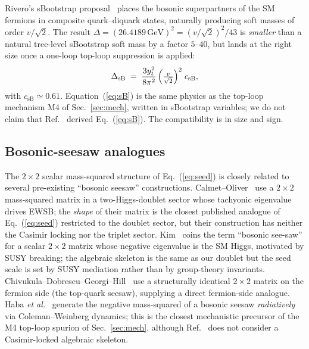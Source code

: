 \documentclass[%
 aps,
 prd,
 reprint,
 nofootinbib,
 superscriptaddress,
 amsmath,
 amssymb,
]{revtex4-2}
\begin{document}
Rivero's sBootstrap proposal~\cite{Rivero2005sBoot} places the bosonic superpartners of the SM fermions in composite quark--diquark states, naturally producing soft masses of order $v/\sqrt{2}$. The result $\Delta=(26.4189\,\mathrm{GeV})^2=(v/\sqrt{2})^2/43$ is \emph{smaller} than a natural tree-level sBootstrap soft mass by a factor $5$--$40$, but lands at the right size once a one-loop top-loop suppression is applied:
\begin{equation}\label{eq:sB}
\Delta_{\mathrm{sB}}\;=\;\frac{3y_t^2}{8\pi^2}\,\Bigl(\tfrac{v}{\sqrt{2}}\Bigr)^2\;c_{\mathrm{sB}},
\end{equation}
with $c_{\mathrm{sB}}\simeq 0.61$. Equation~(\ref{eq:sB}) is the same physics as the top-loop mechanism M4 of Sec.~\ref{sec:mech}, written in sBootstrap variables; we do not claim that Ref.~\cite{Rivero2005sBoot} derived Eq.~(\ref{eq:sB}). The compatibility is in size and sign.

\subsection{Bosonic-seesaw analogues}\label{sec:corpus_loop}

The $2\times 2$ scalar mass-squared structure of Eq.~(\ref{eq:seed}) is closely related to several pre-existing ``bosonic seesaw'' constructions. Calmet--Oliver~\cite{CalmetOliver2007} use a $2\times 2$ mass-squared matrix in a two-Higgs-doublet sector whose tachyonic eigenvalue drives EWSB; the \emph{shape} of their matrix is the closest published analogue of Eq.~(\ref{eq:seed}) restricted to the doublet sector, but their construction has neither the Casimir locking nor the triplet sector. Kim~\cite{Kim2005} coins the term ``bosonic see-saw'' for a scalar $2\times 2$ matrix whose negative eigenvalue is the SM Higgs, motivated by SUSY breaking; the algebraic skeleton is the same as our doublet but the seed scale is set by SUSY mediation rather than by group-theory invariants. Chivukula--Dobrescu--Georgi--Hill~\cite{Chivukula1999} use a structurally identical $2\times 2$ matrix on the fermion side (the top-quark seesaw), supplying a direct fermion-side analogue. Haba \emph{et al.}~\cite{Haba2016} generate the negative mass-squared of a bosonic seesaw \emph{radiatively} via Coleman--Weinberg dynamics; this is the closest mechanistic precursor of the M4 top-loop spurion of Sec.~\ref{sec:mech}, although Ref.~\cite{Haba2016} does not consider a Casimir-locked algebraic skeleton.

\end{document}
